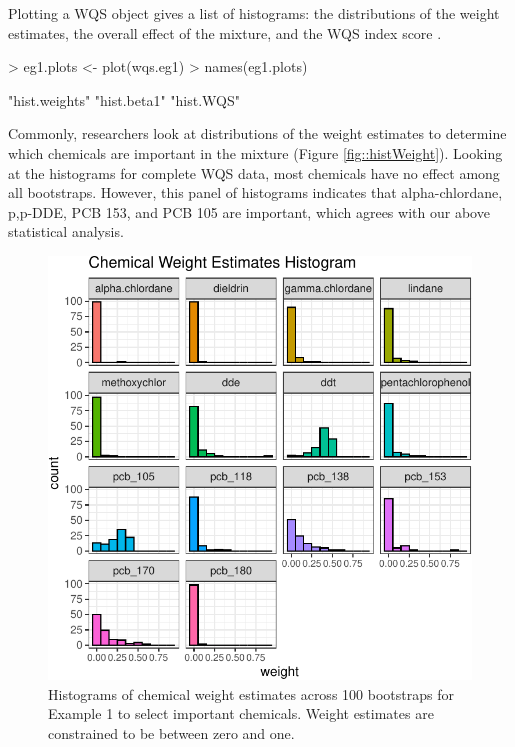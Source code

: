 Plotting a WQS object gives a list of histograms: the distributions of
the weight estimates, the overall effect of the mixture, and the WQS
index score \citep{wickhamGgplot2ElegantGraphics2016}.

\begin{Schunk}
\begin{Sinput}
> eg1.plots <- plot(wqs.eg1)
> names(eg1.plots)
\end{Sinput}
\begin{Soutput}
[1] "hist.weights" "hist.beta1"   "hist.WQS"    
\end{Soutput}
\end{Schunk}

Commonly, researchers look at distributions of the weight estimates to
determine which chemicals are important in the mixture (Figure
\ref{fig::histWeight}). Looking at the histograms for complete WQS data,
most chemicals have no effect among all bootstraps. However, this panel
of histograms indicates that alpha-chlordane, p,p-DDE, PCB 153, and PCB
105 are important, which agrees with our above statistical analysis.


\begin{figure}[h]

{\centering \includegraphics{hargarten_wheeler_files/figure-latex/histWeight-1.pdf} 

}

\caption{\label{fig::histWeight} Histograms of chemical weight estimates across 100 bootstraps for Example 1 to select important chemicals. Weight estimates are constrained to be between zero and one.}\label{fig:histWeight}
\end{figure}


